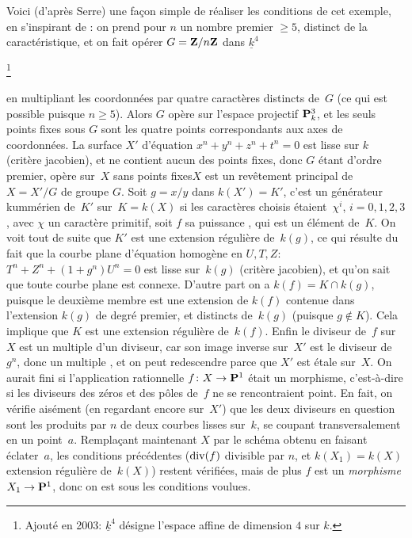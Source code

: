 Voici (d'apr\`es Serre) une fa\c con simple de r\'ealiser les
conditions de cet exemple, en s'inspirant de \cite[]{XI.5}: on prend
pour $n$ un nombre premier $\geq 5$, distinct de la
caract\'eristique, et on fait op\'erer $G=\mathbf{Z}/n\mathbf{Z}$ dans
$\underline{k}^4${\renewcommand{\thefootnote}{*}\addtocounter{footnote}{-1}\footnote{\lcrochetbf Ajout\'e en 2003: $\underline{k}^4$ d\'esigne l'espace affine de dimension $4$ sur $k$.\rcrochetbf}}
en multipliant les coordonn\'ees par quatre
caract\`eres distincts de~$G$ (ce qui est possible puisque $n\geq
5$). Alors $G$ op\`ere sur l'espace projectif $\mathbf{P}^3_k$, et les
seuls points fixes sous $G$ sont les quatre points correspondants aux
axes de coordonn\'ees. La surface $X'$ d'\'equation
$x^n+y^n+z^n+t^n=0$
est lisse sur
$k$ (crit\`ere jacobien), et ne contient aucun des points fixes,
donc $G$ \'etant d'ordre premier, op\`ere sur~$X$ \og sans points
fixes\fg \ie $X$ est un rev\^etement principal de~$X=X'/G$ de groupe
$G$. Soit $g=x/y$ dans $k(X')=K'$, c'est un g\'en\'erateur
kumm\'erien de~$K'$ sur~$K=k(X)$ si les caract\`eres choisis
\'etaient~$\chi^i$, $i=0,1,2,3$, avec $\chi$ un caract\`ere
primitif, soit $f$ sa puissance \nieme, qui est un
\'el\'ement de~$K$. On voit tout de suite que $K'$ est une
extension r\'eguli\`ere de~$k(g)$, ce qui r\'esulte du fait que
la courbe plane d'\'equation homog\`ene en $U,T,Z$:
$T^n+Z^n+(1+g^n)U^n=0$ est lisse sur~$k(g)$ (crit\`ere jacobien), et
qu'on sait que toute courbe plane est connexe. D'autre part on a
$k(f)=K\cap k(g)$, puisque le deuxi\`eme membre est une extension de
$k(f)$ contenue dans l'extension $k(g)$ de degr\'e premier, et
distincts de~$k(g)$ (puisque $g\not\in K$). Cela implique que $K$ est
une extension r\'eguli\`ere de~$k(f)$. Enfin le diviseur de~$f$
sur~$X$ est un multiple \nieme d'un diviseur, car son image
inverse sur~$X'$ est le diviseur de~$g^n$, donc un multiple
\nieme, et on peut redescendre parce que $X'$ est \'etale sur~$X$. On aurait fini si l'application rationnelle $f\colon X\to \PP^1$
\'etait un morphisme, c'est-\`a-dire si les diviseurs des
z\'eros et des p\^oles de~$f$ ne se rencontraient point. En fait,
on v\'erifie ais\'ement (en regardant encore sur~$X'$) que les
deux diviseurs en question sont les produits par $n$ de deux courbes
lisses sur~$k$, se coupant transversalement en un point~$a$. Rempla\c cant maintenant $X$ par le sch\'ema obtenu en faisant \'eclater~$a$, les conditions pr\'ec\'edentes ($\operatorname{\mathrm{div}}(f)$ divisible par
$n$, et $k(X_1)=k(X)$ extension r\'eguli\`ere de~$k(X)$) restent
v\'erifi\'ees, mais de plus $f$ est un \emph{morphisme} $X_1\to
\PP^1$, donc on est sous les conditions voulues.

